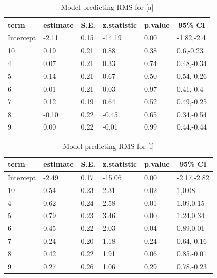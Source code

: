 \documentclass[
]{article}
\begin{document}
\begin{table}[tbp]

\begin{center}
\begin{threeparttable}

\caption{\label{tab:RMS-model-tbl-a}Model predicting RMS for [a]}

\begin{tabular}{llllll}
\toprule
term & \multicolumn{1}{c}{estimate} & \multicolumn{1}{c}{S.E.} & \multicolumn{1}{c}{z.statistic} & \multicolumn{1}{c}{p.value} & \multicolumn{1}{c}{95\% CI}\\
\midrule
Intercept & -2.11 & 0.15 & -14.19 & 0.00 & -1.82,-2.4\\
10 & 0.19 & 0.21 & 0.88 & 0.38 & 0.6,-0.23\\
4 & 0.07 & 0.21 & 0.33 & 0.74 & 0.48,-0.34\\
5 & 0.14 & 0.21 & 0.67 & 0.50 & 0.54,-0.26\\
6 & 0.01 & 0.21 & 0.03 & 0.97 & 0.41,-0.4\\
7 & 0.12 & 0.19 & 0.64 & 0.52 & 0.49,-0.25\\
8 & -0.10 & 0.22 & -0.45 & 0.65 & 0.34,-0.54\\
9 & 0.00 & 0.22 & -0.01 & 0.99 & 0.44,-0.44\\
\bottomrule
\end{tabular}

\end{threeparttable}
\end{center}

\end{table}

\begin{table}[tbp]

\begin{center}
\begin{threeparttable}

\caption{\label{tab:RMS-model-tbl-i}Model predicting RMS for [i]}

\begin{tabular}{llllll}
\toprule
term & \multicolumn{1}{c}{estimate} & \multicolumn{1}{c}{S.E.} & \multicolumn{1}{c}{z.statistic} & \multicolumn{1}{c}{p.value} & \multicolumn{1}{c}{95\% CI}\\
\midrule
Intercept & -2.49 & 0.17 & -15.06 & 0.00 & -2.17,-2.82\\
10 & 0.54 & 0.23 & 2.31 & 0.02 & 1,0.08\\
4 & 0.62 & 0.24 & 2.58 & 0.01 & 1.09,0.15\\
5 & 0.79 & 0.23 & 3.46 & 0.00 & 1.24,0.34\\
6 & 0.45 & 0.22 & 2.03 & 0.04 & 0.89,0.01\\
7 & 0.24 & 0.20 & 1.18 & 0.24 & 0.64,-0.16\\
8 & 0.42 & 0.22 & 1.91 & 0.06 & 0.85,-0.01\\
9 & 0.27 & 0.26 & 1.06 & 0.29 & 0.78,-0.23\\
\bottomrule
\end{tabular}

\end{threeparttable}
\end{center}

\end{table}
\end{document}
